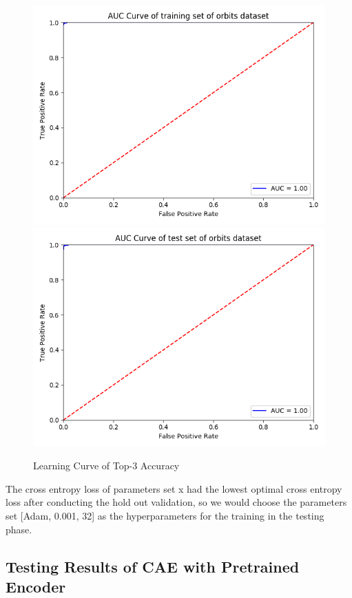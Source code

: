 \documentclass{article}
\begin{document}
\begin{figure}[h]
  \centering
  \includegraphics[scale=0.3]{orbits_auc_train.png}
  \includegraphics[scale=0.3]{orbits_auc_test.png}
  \caption{Learning Curve of Top-3 Accuracy}
\end{figure}

The cross entropy loss of parameters set x had the lowest optimal cross entropy loss after conducting the hold out validation, so we would choose the parameters set [Adam, 0.001, 32] as the hyperparameters for the training in the testing phase.

\subsection{Testing Results of CAE with Pretrained Encoder}
\end{document}
